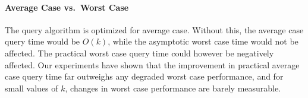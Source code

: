 \documentclass[a4]{article}
\newcommand*{\pref}{\prettyref}
\begin{document}
\paragraph{Average Case vs.\ Worst Case\label{sec:improved-avg}}

The query algorithm is optimized for average case. Without this, the average case query time would be $O(k)$, while the asymptotic worst case time would not be affected. The practical worst case query time could however be negatively affected.
Our experiments have shown that the improvement in practical average case query time far outweighs any degraded worst case performance, and for small values of $k$, changes in worst case performance are barely measurable.

\end{document}
